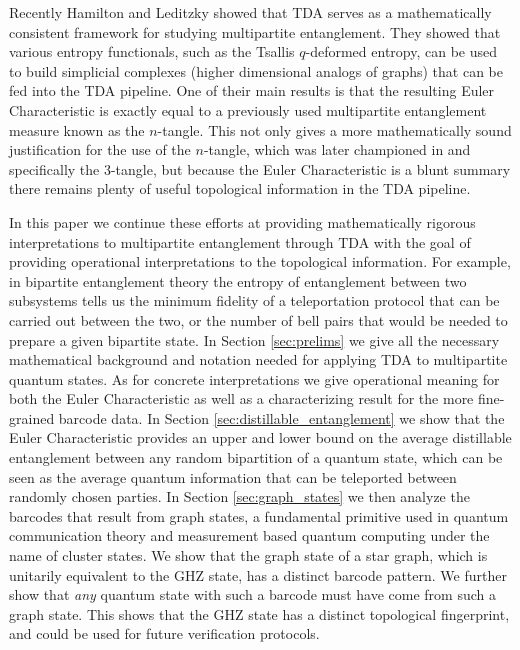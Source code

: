 \documentclass{article}
\begin{document}
Recently Hamilton and Leditzky \cite{hamilton2023probing} showed that TDA serves as a mathematically consistent framework for studying multipartite entanglement. They showed that various entropy functionals, such as the Tsallis $q$-deformed entropy, can be used to build simplicial complexes (higher dimensional analogs of graphs) that can be fed into the TDA pipeline. One of their main results is that the resulting Euler Characteristic is exactly equal to a previously used multipartite entanglement measure known as the $n$-tangle. This not only gives a more mathematically sound justification for the use of the $n$-tangle, which was later championed in \cite{horodecki2024multipartiteentanglement} and specifically the 3-tangle, but because the Euler Characteristic is a blunt summary there remains plenty of useful topological information in the TDA pipeline. 

In this paper we continue these efforts at providing mathematically rigorous interpretations to multipartite entanglement through TDA with the goal of providing operational interpretations to the topological information. For example, in bipartite entanglement theory the entropy of entanglement between two subsystems tells us the minimum fidelity of a teleportation protocol that can be carried out between the two, or the number of bell pairs that would be needed to prepare a given bipartite state. In Section \ref{sec:prelims} we give all the necessary mathematical background and notation needed for applying TDA to multipartite quantum states. As for concrete interpretations we give operational meaning for both the Euler Characteristic as well as a characterizing result for the more fine-grained barcode data. In Section \ref{sec:distillable_entanglement} we show that the Euler Characteristic provides an upper and lower bound on the average distillable entanglement between any random bipartition of a quantum state, which can be seen as the average quantum information that can be teleported between randomly chosen parties. In Section \ref{sec:graph_states} we then analyze the barcodes that result from graph states, a fundamental primitive used in quantum communication theory and measurement based quantum computing \cite{nielsen2006} under the name of cluster states. We show that the graph state of a star graph, which is unitarily equivalent to the GHZ state, has a distinct barcode pattern. We further show that \emph{any} quantum state with such a barcode must have come from such a graph state. This shows that the GHZ state has a distinct topological fingerprint, and could be used for future verification protocols. 
 
\end{document}

